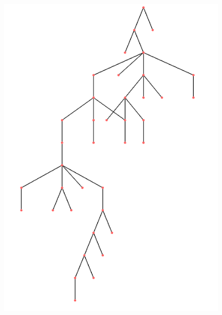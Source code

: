 \documentclass{article}
\begin{document}
\begin{figure}[h]
\begin{center}
\begin{left}
          \includegraphics[scale=0.22]{exemple2.png}
        \end{left}
        \begin{right}

\end{right}
\end{center}
\end{figure}
\end{document}
